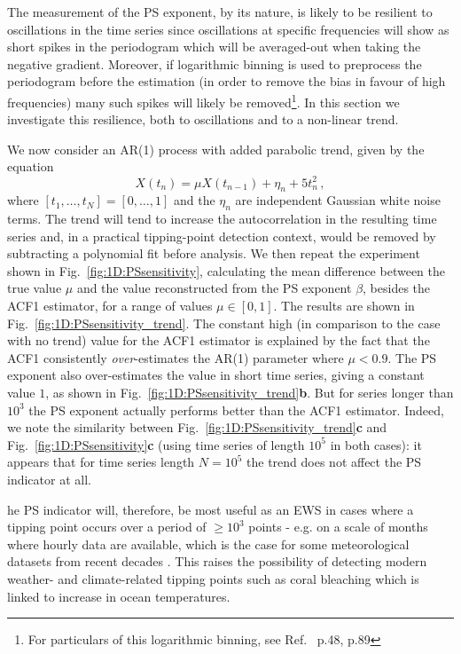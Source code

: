 \documentclass[10pt]{iopart}
\newcommand{\revision}[1]{}
\begin{document}
The measurement of the PS exponent, by its nature, is likely to be resilient to oscillations in the time series since oscillations at specific frequencies will show as short spikes in the periodogram which will be averaged-out when taking the negative gradient. Moreover, if logarithmic binning is used to preprocess the periodogram before the estimation (in order to remove the bias in favour of high frequencies) many such spikes will likely be removed\footnote{For particulars of this logarithmic binning, see Ref.~\cite{prettyman2021} p.48, p.89}. In this section we investigate this resilience, both to oscillations and to a non-linear trend. 

We now consider an AR(1) process with added parabolic trend, given by the equation 
\begin{equation}
	X(t_{n}) = \mu X(t_{n-1}) + \eta_n + 5t_n^2\,,
\end{equation} 
where $[t_1,\dots,t_N] = [0,\dots,1]$ and the $\eta_n$ are independent Gaussian white noise terms. The trend will tend to increase the autocorrelation in the resulting time series and, in a practical tipping-point detection context, would be removed by subtracting a polynomial fit before analysis. We then repeat the experiment shown in Fig.~\ref{fig:1D:PSsensitivity}, calculating the mean difference between the true value $\mu$ and the value reconstructed from the PS exponent $\beta$, besides the ACF1 estimator, for a range of values $\mu\in[0,1]$. The results are shown in Fig.~\ref{fig:1D:PSsensitivity_trend}. The constant high (in comparison to the case with no trend) value for the ACF1 estimator is explained by the fact that the ACF1 consistently \emph{over}-estimates the AR(1) parameter where $\mu<0.9$. The PS exponent also over-estimates the value in short time series, giving a constant value $1$, as shown in Fig.~\ref{fig:1D:PSsensitivity_trend}{\bf b}. But for series longer than $10^3$ the PS exponent actually performs better than the ACF1 estimator. Indeed, we note the similarity between Fig.~\ref{fig:1D:PSsensitivity_trend}{\bf c} and Fig.~\ref{fig:1D:PSsensitivity}{\bf c} (using time series of length $10^5$ in both cases): it appears that for time series length $N=10^5$ the trend does not affect the PS indicator at all. 

{\revision The PS indicator will, therefore, be most useful as an EWS in cases where a tipping point occurs over a period of $\geq 10^3$ points - e.g. on a scale of months where
	hourly data are available, which is the case for some meteorological datasets from recent decades \cite{HadISD, NOAAcoralreefdatabase}. This raises the possibility of detecting modern weather- and climate-related tipping points such as coral bleaching \cite{hoegh2007coral, goreau2021global} which is linked to increase in ocean temperatures. }
\end{document}
